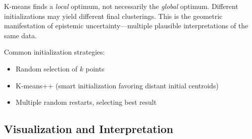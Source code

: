 \begin{remark}
K-means finds a \textit{local} optimum, not necessarily the \textit{global} optimum. Different initializations may yield different final clusterings. This is the geometric manifestation of epistemic uncertainty---multiple plausible interpretations of the same data.

Common initialization strategies:
\begin{itemize}
    \item Random selection of $k$ points
    \item K-means++ (smart initialization favoring distant initial centroids)
    \item Multiple random restarts, selecting best result
\end{itemize}
\end{remark}

\subsection{Visualization and Interpretation}

